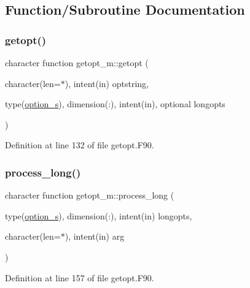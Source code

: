 \subsection{Function/\+Subroutine Documentation}
\mbox{\label{namespacegetopt__m_a39e6b73629162ef91cda0ccf207643a9}} 
\subsubsection{\texorpdfstring{getopt()}{getopt()}}
{\footnotesize\ttfamily character function getopt\+\_\+m\+::getopt (\begin{DoxyParamCaption}\item[{character(len=$\ast$), intent(in)}]{optstring,  }\item[{type(\mbox{\hyperlink{structgetopt__m_1_1option__s}{option\+\_\+s}}), dimension(\+:), intent(in), optional}]{longopts }\end{DoxyParamCaption})}



Definition at line 132 of file getopt.\+F90.

\mbox{\label{namespacegetopt__m_a588c76592ce4cff0901b32c7095ab6bb}} 
\subsubsection{\texorpdfstring{process\+\_\+long()}{process\_long()}}
{\footnotesize\ttfamily character function getopt\+\_\+m\+::process\+\_\+long (\begin{DoxyParamCaption}\item[{type(\mbox{\hyperlink{structgetopt__m_1_1option__s}{option\+\_\+s}}), dimension(\+:), intent(in)}]{longopts,  }\item[{character(len=$\ast$), intent(in)}]{arg }\end{DoxyParamCaption})}



Definition at line 157 of file getopt.\+F90.

\mbox{\label{namespacegetopt__m_ab9181edeba025c1b397b54536a3fb54d}} 
